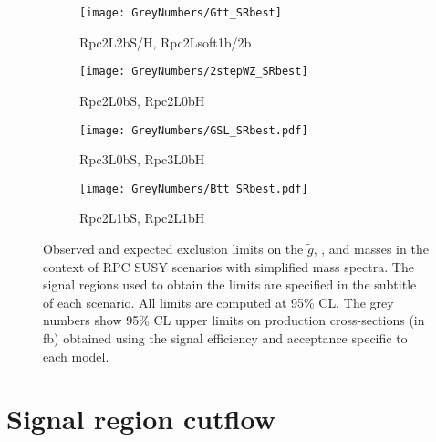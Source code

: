 \begin{figure}[htb!]
\centering
\begin{subfigure}[t]{0.49\textwidth}\texttt{[image: GreyNumbers/Gtt\_SRbest]}\caption{Rpc2L2bS/H, Rpc2Lsoft1b/2b}\label{fig:GN_limits_feynman_gtt}\end{subfigure}
\begin{subfigure}[t]{0.49\textwidth}\texttt{[image: GreyNumbers/2stepWZ\_SRbest]}\caption{Rpc2L0bS, Rpc2L0bH}\label{fig:GN_limits_feynman_gg2WZ}\end{subfigure}
\begin{subfigure}[t]{0.49\textwidth}\texttt{[image: GreyNumbers/GSL\_SRbest.pdf]}\caption{Rpc3L0bS, Rpc3L0bH}\label{fig:GN_limits_feynman_gg2sl}\end{subfigure}
\begin{subfigure}[t]{0.49\textwidth}\texttt{[image: GreyNumbers/Btt\_SRbest.pdf]}\caption{Rpc2L1bS, Rpc2L1bH}\label{fig:GN_limits_feynman_b1b1}\end{subfigure}

\caption{Observed and expected exclusion limits on the $\tilde{g}$, \sbottomone, and \ninoone masses 
in the context of RPC SUSY scenarios with simplified mass spectra. The signal regions used to obtain the limits are specified in the subtitle of each scenario. All limits are computed at 95\% CL. 
The grey numbers show 95\% CL upper limits on production cross-sections (in fb) obtained using the signal efficiency and acceptance specific to each model.}
\label{fig:Results_Limits_RPC_GN} 
\end{figure} 

\clearpage

\section{Signal region cutflow}
\label{app:aux.SRcut}

